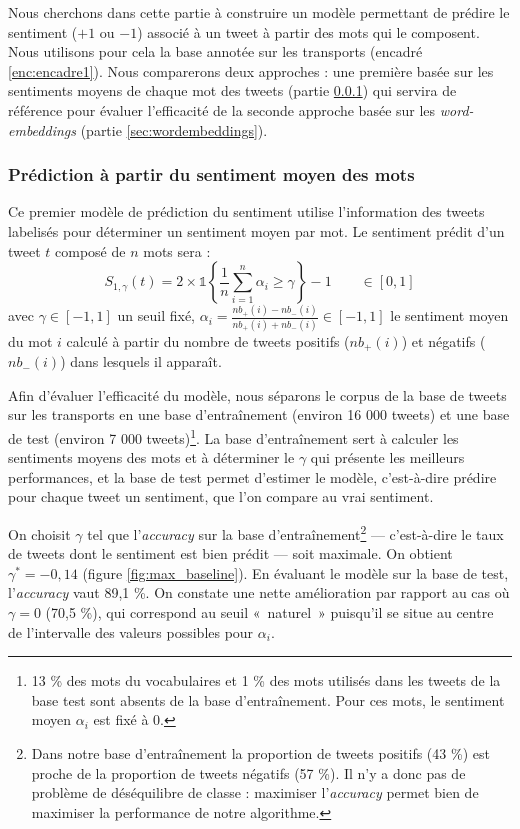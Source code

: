 \documentclass[11pt,french,french]{article}
\let\rmarkdownfootnote\footnote%
\def\footnote{\protect\rmarkdownfootnote}
\begin{document}
Nous cherchons dans cette partie à construire un modèle permettant de prédire le sentiment (\(+1\) ou \(-1\)) associé à un tweet à partir des mots qui le composent.
Nous utilisons pour cela la base annotée sur les transports (encadré \ref{enc:encadre1}).
Nous comparerons deux approches : une première basée sur les sentiments moyens de chaque mot des tweets (partie \ref{sec:sentiments}) qui servira de référence pour évaluer l'efficacité de la seconde approche basée sur les \emph{word-embeddings} (partie \ref{sec:wordembeddings}).

\hypertarget{sec:sentiments}{%
\subsubsection{Prédiction à partir du sentiment moyen des mots}\label{sec:sentiments}}

Ce premier modèle de prédiction du sentiment utilise l'information des tweets labelisés pour déterminer un sentiment moyen par mot.
Le sentiment prédit d'un tweet \(t\) composé de \(n\) mots sera :
\[S_{1,\gamma}(t) = 2 \times \mathds{1}\left\{ \frac{1}{n} \sum \limits_{i=1}^n \alpha_i \geq \gamma\right\} - 1 \qquad \in [0,1]\]
avec \(\gamma \in [-1,1]\) un seuil fixé, \(\alpha_i = \frac{nb_+(i) - nb_-(i)}{nb_+(i) + nb_-(i)} \in [-1,1]\) le sentiment moyen du mot \(i\) calculé à partir du nombre de tweets positifs (\(nb_+(i)\)) et négatifs (\(nb_-(i)\)) dans lesquels il apparaît.

Afin d'évaluer l'efficacité du modèle, nous séparons le corpus de la base de tweets sur les transports en une base d'entraînement (environ 16 000 tweets) et une base de test (environ 7 000 tweets)\footnote{13 \% des mots du vocabulaires et 1 \% des mots utilisés dans les tweets de la base test sont absents de la base d'entraînement. Pour ces mots, le sentiment moyen \(\alpha_i\) est fixé à 0.}.
La base d'entraînement sert à calculer les sentiments moyens des mots et à déterminer le \(\gamma\) qui présente les meilleurs performances, et la base de test permet d'estimer le modèle, c'est-à-dire prédire pour chaque tweet un sentiment, que l'on compare au vrai sentiment.

On choisit \(\gamma\) tel que l'\emph{accuracy} sur la base d'entraînement\footnote{Dans notre base d'entraînement la proportion de tweets positifs (43 \%) est proche de la proportion de tweets négatifs (57 \%).
  Il n'y a donc pas de problème de déséquilibre de classe : maximiser l'\emph{accuracy} permet bien de maximiser la performance de notre algorithme.} --- c'est-à-dire le taux de tweets dont le sentiment est bien prédit --- soit maximale. On obtient \(\gamma^* = -0,14\) (figure \ref{fig:max_baseline}).
En évaluant le modèle sur la base de test, l'\emph{accuracy} vaut 89,1 \%. On constate une nette amélioration par rapport au cas où \(\gamma = 0\) (70,5 \%), qui correspond au seuil «~naturel~» puisqu'il se situe au centre de l'intervalle des valeurs possibles pour \(\alpha_i\).
\end{document}
